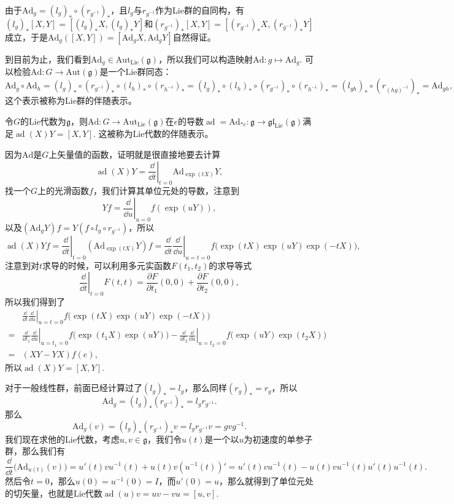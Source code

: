 \documentclass[11pt]{article}
\theoremstyle{definition}
\theoremstyle{plain}
\newcommand{\lag}{{\mathfrak{g}}}
\DeclareMathOperator{\ad}{ad}
\begin{document}
由于$\mathrm{Ad}_g=(l_g)_*\circ (r_{g^{-1}})_*$，且$l_g$与$r_{g^{-1}}$作为Lie群的自同构，有$(l_g)_*[X,Y]=[(l_g)_*X,(l_g)_*Y]$和$(r_{g^{-1}})_*[X,Y]=[(r_{g^{-1}})_*X,(r_{g^{-1}})_*Y]$成立，于是$\mathrm{Ad}_g([X,Y])=[\mathrm{Ad}_gX,\mathrm{Ad}_gY]$自然得证。

\para 到目前为止，我们看到$\mathrm{Ad}_g\in \mathrm{Aut}_{\mathrm{Lie}}(\lag)$，所以我们可以构造映射$\mathrm{Ad}:g\mapsto \mathrm{Ad}_g$. 可以检验$\mathrm{Ad}:G\to \mathrm{Aut}(\lag)$是一个Lie群同态：
\[\mathrm{Ad}_g\circ \mathrm{Ad}_h=(l_g)_*\circ (r_{g^{-1}})_*\circ (l_h)_*\circ (r_{h^{-1}})_*=(l_g)_*\circ (l_h)_*\circ (r_{g^{-1}})_*\circ (r_{h^{-1}})_*=(l_{gh})_*\circ (r_{(hg)^{-1}})_*=\mathrm{Ad}_{gh},\]
这个表示被称为Lie群的伴随表示。


{\pro 令$G$的Lie代数为$\lag$，则$\mathrm{Ad}:G\to \mathrm{Aut}_{\mathrm{Lie}}(\lag)$在$e$的导数$\ad=\mathrm{Ad}_{*e}:\lag\to \mathfrak{gl}_{\mathrm{Lie}}(\lag)$满足$\ad(X)Y=[X,Y]$. 这被称为Lie代数的伴随表示。\endpro}

\proof 因为$\mathrm{Ad}$是$G$上矢量值的函数，证明就是很直接地要去计算
\[
	\ad(X)Y=\left.\frac{\dd}{\dd t}\right|_{t=0}\mathrm{Ad}_{\exp(tX)}Y,
\]
找一个$G$上的光滑函数$f$，我们计算其单位元处的导数，注意到
\[
	Yf=\left.\frac{\dd}{\dd u}\right|_{u=0}f(\exp(uY)),
\]
以及$(\mathrm{Ad}_{g}Y)f=Y(f\circ l_g\circ r_{g^{-1}})$，所以
\[
	\ad(X)Yf=\left.\frac{\dd}{\dd t}\right|_{t=0}(\mathrm{Ad}_{\exp(tX)}Y)f=\left.\frac{\dd}{\dd t}\frac{\dd}{\dd u}\right|_{u=t=0}f\bigl(\exp(tX)\exp(uY)\exp(-tX)\bigr),
\]
注意到对$t$求导的时候，可以利用多元实函数$F(t_1,t_2)$的求导等式
\[
	\left.\frac{\dd}{\dd t}\right|_{t=0}F(t,t)=\frac{\partial F}{\partial t_1}(0,0)+\frac{\partial F}{\partial t_2}(0,0),
\]
所以我们得到了
\[
\begin{split}
	&\left.\frac{\dd}{\dd t}\frac{\dd}{\dd u}\right|_{u=t=0}f\bigl(\exp(tX)\exp(uY)\exp(-tX)\bigr)\\
	=&\left.\frac{\dd}{\dd t_1}\frac{\dd}{\dd u}\right|_{u=t_1=0}f\bigl(\exp(t_1X)\exp(uY)\bigr)-\left.\frac{\dd}{\dd t_2}\frac{\dd}{\dd u}\right|_{u=t_2=0}f\bigl(\exp(uY)\exp(t_2X)\bigr)\\
	=&(XY-YX)f(e),
\end{split}
\]
所以$\ad(X)Y=[X,Y]$.\endproof

\para 对于一般线性群，前面已经计算过了$(l_g)_*=l_g$，那么同样$(r_g)_*=r_g$，所以
\[
	\mathrm{Ad}_g=(l_g)_*(r_{g^{-1}})_*=l_gr_{g^{-1}}.
\]
那么
\[
	\mathrm{Ad}_g(v)=(l_g)_*(r_{g^{-1}})_*v=l_gr_{g^{-1}}v=gvg^{-1}.
\]
我们现在求他的Lie代数，考虑$u,v\in \lag$，我们令$u(t)$是一个以$u$为初速度的单参子群，那么我们有
\[
	\frac{\dd}{\dd t}\bigl(\mathrm{Ad}_{u(t)}(v)\bigr)=u'(t)vu^{-1}(t)+u(t)v(u^{-1}(t))'=u'(t)vu^{-1}(t)-u(t)vu^{-1}(t)u'(t)u^{-1}(t).
\]
然后令$t=0$，那么$u(0)=u^{-1}(0)=I$，而$u'(0)=u$，那么就得到了单位元处的切矢量，也就是Lie代数$\ad(u)v=uv-vu=[u,v]$.
\end{document}
